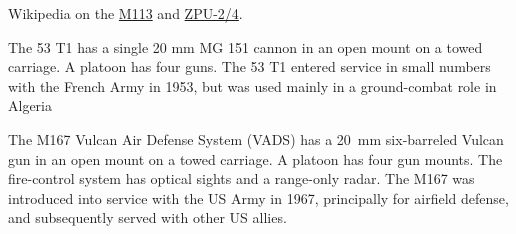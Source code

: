 \begin{withcounters}
{        \begin{notesources}
            \item Wikipedia on the \href{https://en.wikipedia.org/wiki/M113_armored_personnel_carrier}{M113} and \href{https://en.wikipedia.org/wiki/ZPU}{ZPU-2/4}.
        \end{notesources}
    }



    The 53 T1 has a single 20 mm MG 151 cannon in an open mount on a towed carriage.
    A platoon has four guns.
    The 53 T1 entered service in small numbers with the French Army in 1953, but was used mainly in a ground-combat role in Algeria%


    The M167 Vulcan Air Defense System (VADS) has a 20~mm six-barreled Vulcan gun in an open mount on a towed carriage. A platoon has four gun mounts. The fire-control system has optical sights and a range-only radar.
    The M167 was introduced into service with the US Army in 1967, principally for airfield defense, and subsequently served with other US allies.%
\end{withcounters}
